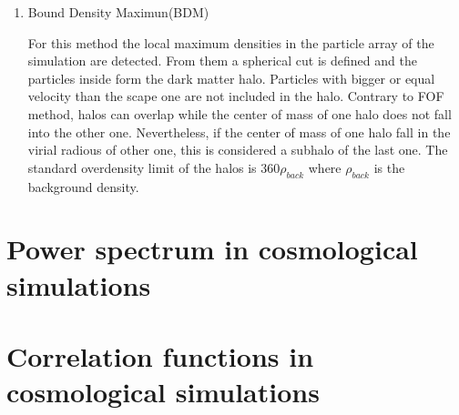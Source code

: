 \begin{enumerate}
\item Bound Density Maximun(BDM)

For this method the local maximum densities in the particle array of the simulation
are detected. From them a spherical cut is defined and the particles inside form 
the dark matter halo. Particles with bigger or equal velocity than the scape one
are not included in the halo. 
Contrary to FOF method, halos can overlap while the center of mass of one halo 
does not fall into the other one. Nevertheless, if the center of mass of one halo
fall in the virial radious of other one, this is considered a subhalo of the last
one. The standard overdensity limit of the halos is $360\rho_{back}$ where $\rho_{back}$
is the background density. 

\end{enumerate}

\section{ Power spectrum in cosmological simulations }

\section{ Correlation functions in cosmological simulations }


